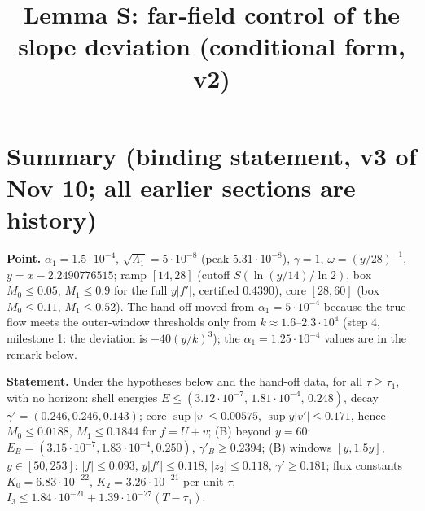 \documentclass[11pt]{article}
\begin{document}
\title{Lemma S: far-field control of the slope deviation (conditional form, v2)}
\date{}\maketitle
\section*{Summary (binding statement, v3 of Nov 10; all earlier sections are history)}
\scriptsize\noindent\textbf{Point.} $\alpha_1=1.5\cdot10^{-4}$, $\sqrt{\Lambda_1}=5\cdot10^{-8}$ (peak $5.31\cdot10^{-8}$), $\gamma=1$, $\omega=(y/28)^{-1}$, $y=x-2.2490776515$; ramp $[14,28]$ (cutoff $S(\ln(y/14)/\ln2)$, box $M_0\le0.05$, $M_1\le0.9$ for the full $y|f'|$, certified $0.4390$), core $[28,60]$ (box $M_0\le0.11$, $M_1\le0.52$). The hand-off moved from $\alpha_1=5\cdot10^{-4}$ because the true flow meets the outer-window thresholds only from $k\approx1.6$--$2.3\cdot10^4$ (step 4, milestone 1: the deviation is $-40(y/k)^3$); the $\alpha_1=1.25\cdot10^{-4}$ values are in the remark below.

\noindent\textbf{Statement.} Under the hypotheses below and the hand-off data, for all $\tau\ge\tau_1$, with no horizon: shell energies $E\le(3.12\cdot10^{-7},\,1.81\cdot10^{-4},\,0.248)$, decay $\gamma'=(0.246,0.246,0.143)$; core $\sup|v|\le0.00575$, $\sup y|v'|\le0.171$, hence $M_0\le0.0188$, $M_1\le0.1844$ for $f=U+v$; (B) beyond $y=60$: $E_B=(3.15\cdot10^{-7},1.83\cdot10^{-4},0.250)$, $\gamma'_B\ge0.2394$; (B) windows $[y,1.5y]$, $y\in[50,253]$: $|f|\le0.093$, $y|f'|\le0.118$, $|z_2|\le0.118$, $\gamma'\ge0.181$; flux constants $K_0=6.83\cdot10^{-22}$, $K_2=3.26\cdot10^{-21}$ per unit $\tau$, $I_3\le1.84\cdot10^{-21}+1.39\cdot10^{-27}(T-\tau_1)$.
\end{document}
